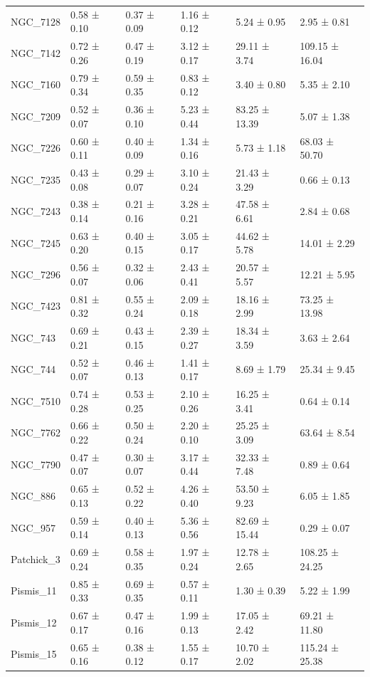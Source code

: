 \begin{tabular}{llllll}
NGC_7128 & 0.58 ± 0.10 & 0.37 ± 0.09 & 1.16 ± 0.12 & 5.24 ± 0.95 & 2.95 ± 0.81 \\
NGC_7142 & 0.72 ± 0.26 & 0.47 ± 0.19 & 3.12 ± 0.17 & 29.11 ± 3.74 & 109.15 ± 16.04 \\
NGC_7160 & 0.79 ± 0.34 & 0.59 ± 0.35 & 0.83 ± 0.12 & 3.40 ± 0.80 & 5.35 ± 2.10 \\
NGC_7209 & 0.52 ± 0.07 & 0.36 ± 0.10 & 5.23 ± 0.44 & 83.25 ± 13.39 & 5.07 ± 1.38 \\
NGC_7226 & 0.60 ± 0.11 & 0.40 ± 0.09 & 1.34 ± 0.16 & 5.73 ± 1.18 & 68.03 ± 50.70 \\
NGC_7235 & 0.43 ± 0.08 & 0.29 ± 0.07 & 3.10 ± 0.24 & 21.43 ± 3.29 & 0.66 ± 0.13 \\
NGC_7243 & 0.38 ± 0.14 & 0.21 ± 0.16 & 3.28 ± 0.21 & 47.58 ± 6.61 & 2.84 ± 0.68 \\
NGC_7245 & 0.63 ± 0.20 & 0.40 ± 0.15 & 3.05 ± 0.17 & 44.62 ± 5.78 & 14.01 ± 2.29 \\
NGC_7296 & 0.56 ± 0.07 & 0.32 ± 0.06 & 2.43 ± 0.41 & 20.57 ± 5.57 & 12.21 ± 5.95 \\
NGC_7423 & 0.81 ± 0.32 & 0.55 ± 0.24 & 2.09 ± 0.18 & 18.16 ± 2.99 & 73.25 ± 13.98 \\
NGC_743 & 0.69 ± 0.21 & 0.43 ± 0.15 & 2.39 ± 0.27 & 18.34 ± 3.59 & 3.63 ± 2.64 \\
NGC_744 & 0.52 ± 0.07 & 0.46 ± 0.13 & 1.41 ± 0.17 & 8.69 ± 1.79 & 25.34 ± 9.45 \\
NGC_7510 & 0.74 ± 0.28 & 0.53 ± 0.25 & 2.10 ± 0.26 & 16.25 ± 3.41 & 0.64 ± 0.14 \\
NGC_7762 & 0.66 ± 0.22 & 0.50 ± 0.24 & 2.20 ± 0.10 & 25.25 ± 3.09 & 63.64 ± 8.54 \\
NGC_7790 & 0.47 ± 0.07 & 0.30 ± 0.07 & 3.17 ± 0.44 & 32.33 ± 7.48 & 0.89 ± 0.64 \\
NGC_886 & 0.65 ± 0.13 & 0.52 ± 0.22 & 4.26 ± 0.40 & 53.50 ± 9.23 & 6.05 ± 1.85 \\
NGC_957 & 0.59 ± 0.14 & 0.40 ± 0.13 & 5.36 ± 0.56 & 82.69 ± 15.44 & 0.29 ± 0.07 \\
Patchick_3 & 0.69 ± 0.24 & 0.58 ± 0.35 & 1.97 ± 0.24 & 12.78 ± 2.65 & 108.25 ± 24.25 \\
Pismis_11 & 0.85 ± 0.33 & 0.69 ± 0.35 & 0.57 ± 0.11 & 1.30 ± 0.39 & 5.22 ± 1.99 \\
Pismis_12 & 0.67 ± 0.17 & 0.47 ± 0.16 & 1.99 ± 0.13 & 17.05 ± 2.42 & 69.21 ± 11.80 \\
Pismis_15 & 0.65 ± 0.16 & 0.38 ± 0.12 & 1.55 ± 0.17 & 10.70 ± 2.02 & 115.24 ± 25.38 \\

\end{tabular}
